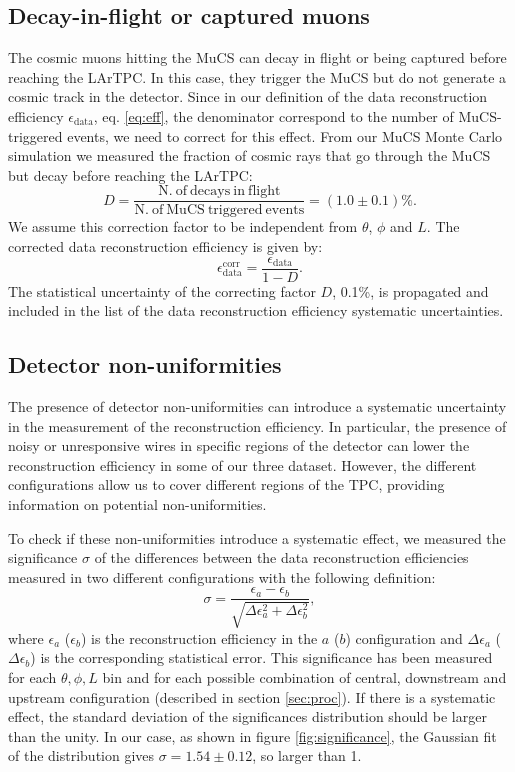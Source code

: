 \documentclass[a4paper]{scrartcl}
\begin{document}
\subsection{Decay-in-flight or captured muons}\label{sec:dif}
The cosmic muons hitting the MuCS can decay in flight or being captured before reaching the LArTPC. In this case, they trigger the MuCS but do not generate a cosmic track in the detector. Since in our definition of the data reconstruction efficiency $\epsilon_{\mathrm{data}}$, eq. \eqref{eq:eff}, the denominator correspond to the number of MuCS-triggered events, we need to correct for this effect. From our MuCS Monte Carlo simulation we measured the fraction of cosmic rays that go through the MuCS but decay before reaching the LArTPC:
\begin{equation}
D = \frac{\mathrm{N.~of~decays~in~flight}}{\mathrm{N.~of~MuCS~triggered~events}} = (1.0 \pm 0.1) \%.
\end{equation}
We assume this correction factor to be independent from $\theta$, $\phi$ and $L$. The corrected data reconstruction efficiency is given by:
\begin{equation}
\epsilon_{\mathrm{data}}^{\mathrm{corr}} =  \frac{\epsilon_{\mathrm{data}}}{1-D}.
\end{equation}
The statistical uncertainty of the correcting factor $D$, 0.1\%, is propagated and included in the list of the data reconstruction efficiency systematic uncertainties.

\subsection{Detector non-uniformities}\label{sec:wires}
The presence of detector non-uniformities can introduce a systematic uncertainty in the measurement of the reconstruction efficiency. In particular, the presence of noisy or unresponsive wires in specific regions of the detector can lower the reconstruction efficiency in some of our three dataset. However, the different configurations allow us to cover different regions of the TPC, providing information on potential non-uniformities.

To check if these non-uniformities introduce a systematic effect, we measured the significance $\sigma$ of the differences between the data reconstruction efficiencies measured in two different configurations with the following definition:
\begin{equation}
\sigma = \frac{\epsilon_a-\epsilon_b}{\sqrt{\Delta \epsilon_{a}^2 + \Delta \epsilon_b^2}},
\end{equation}
where $\epsilon_{a}$ ($\epsilon_{b}$) is the reconstruction efficiency in the $a$ ($b$) configuration and $\Delta \epsilon_{a}$ ($\Delta \epsilon_{b}$) is the corresponding statistical error. This significance has been measured for each $\theta,\phi,L$ bin and for each possible combination of central, downstream and upstream configuration (described in section \ref{sec:proc}). If there is a systematic effect, the standard deviation of the significances distribution should be larger than the unity. In our case, as shown in figure \ref{fig:significance}, the Gaussian fit of the distribution gives $\sigma = 1.54\pm0.12$, so larger than 1.
\end{document}
